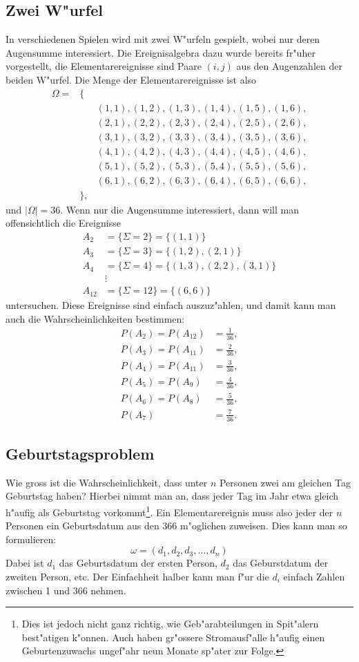 \subsection{Zwei W"urfel}
In verschiedenen Spielen wird mit zwei W"urfeln gespielt, wobei nur
deren Augensumme interessiert. Die Ereignisalgebra dazu wurde bereits
fr"uher vorgestellt, die Elementarereignisse sind Paare $(i,j)$ aus
den Augenzahlen der beiden W"urfel. Die Menge der Elementarereignisse
ist also
\begin{eqnarray*}
\Omega=&\{&\\
&&(1,1),(1,2),(1,3),(1,4),(1,5),(1,6),\\
&&(2,1),(2,2),(2,3),(2,4),(2,5),(2,6),\\
&&(3,1),(3,2),(3,3),(3,4),(3,5),(3,6),\\
&&(4,1),(4,2),(4,3),(4,4),(4,5),(4,6),\\
&&(5,1),(5,2),(5,3),(5,4),(5,5),(5,6),\\
&&(6,1),(6,2),(6,3),(6,4),(6,5),(6,6),\\
&\},&
\end{eqnarray*}
und $|\Omega|=36$. Wenn nur die Augensumme interessiert, dann will
man offensichtlich die Ereignisse
\begin{align*}
A_2&=\{\Sigma=2\}=\{(1,1)\}\\
A_3&=\{\Sigma=3\}=\{(1,2),(2,1)\}\\
A_4&=\{\Sigma=4\}=\{(1,3),(2,2),(3,1)\}\\
&\vdots\\
A_{12}&=\{\Sigma=12\}=\{(6,6)\}
\end{align*}
untersuchen.
Diese Ereignisse sind einfach auszuz"ahlen, und damit kann man auch
die Wahrscheinlichkeiten bestimmen:
\begin{align*}
P(A_2)=P(A_{12})&=\frac{1}{36},\\
P(A_3)=P(A_{11})&=\frac{2}{36},\\
P(A_4)=P(A_{11})&=\frac{3}{36},\\
P(A_5)=P(A_9)&=\frac{4}{36},\\
P(A_6)=P(A_8)&=\frac{5}{36},\\
P(A_7)&=\frac{7}{36}.
\end{align*}

\subsection{Geburtstagsproblem}
Wie gross ist die Wahrscheinlichkeit, dass unter $n$ Personen zwei
am gleichen Tag Geburtstag haben? Hierbei nimmt man an, dass
jeder Tag im Jahr etwa gleich h"aufig als Geburtstag
vorkommt\footnote{Dies ist
jedoch nicht ganz richtig, wie Geb"arabteilungen in Spit"alern
best"atigen k"onnen. Auch haben gr"ossere Stromausf"alle h"aufig
einen Geburtenzuwachs ungef"ahr neun Monate sp"ater zur Folge.}.
Ein Elementarereignis muss also jeder der $n$ Personen ein
Geburtsdatum aus den $366$ m"oglichen zuweisen. Dies kann man so
formulieren:
\[
\omega=(d_1, d_2, d_3,\dots,d_n)
\]
Dabei ist $d_1$ das Geburtsdatum der ersten Person, $d_2$ das
Geburstdatum der zweiten Person, etc. Der Einfachheit halber kann
man f"ur die $d_i$ einfach Zahlen zwischen 1 und 366 nehmen.

